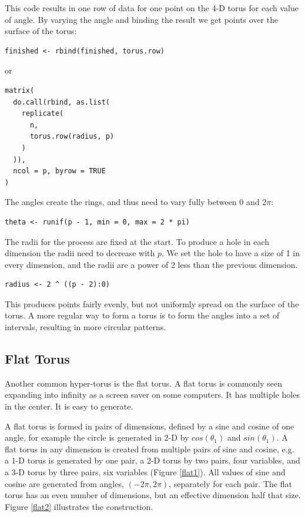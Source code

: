 This code results in one row of data for one point on the 4-D torus
for each value of angle.  By varying the angle and binding the result
we get points over the surface of the torus:

\begin{verbatim}
finished <- rbind(finished, torus.row)
\end{verbatim}

or

\begin{verbatim}
matrix(
  do.call(rbind, as.list(
    replicate(
      n,
      torus.row(radius, p)
    )
  )),
  ncol = p, byrow = TRUE
)
\end{verbatim}

The angles create the rings, and thus need to vary fully between 0 and
$2\pi$:

\begin{verbatim}
theta <- runif(p - 1, min = 0, max = 2 * pi)
\end{verbatim}

The radii for the process are fixed at the start.  To produce a hole
in each dimension the radii need to decrease with $p$.  We set the
hole to have a size of 1 in every dimension, and the radii are a power
of 2 less than the previous dimension.

\begin{verbatim}
radius <- 2 ^ ((p - 2):0)
\end{verbatim}

\noindent This produces points fairly evenly, but not uniformly spread on the surface of
the torus.  A more regular way to form a torus is to form the angles
into a set of intervals, resulting in more circular patterns.

\subsection{Flat Torus}

Another common hyper-torus is the flat torus. A flat torus is commonly
seen expanding into infinity as a screen saver on some computers. It
has multiple holes in the center. It is easy to generate.

A flat torus is formed in pairs of dimensions, defined by a sine and
cosine of one angle, for example the circle is generated in 2-D by
$cos(\theta_1)$ and $sin(\theta_1)$.  A flat torus in any dimension is created
from multiple pairs of sine and cosine, e.g. a 1-D torus is generated by
one pair, a 2-D torus by two pairs, four variables, and a 3-D torus by
three pairs, six variables (Figure \ref{flat1}).  All values of sine
and cosine are generated from angles, $(-2\pi, 2\pi)$, separately for
each pair.  The flat torus has an even number of dimensions, but an
effective dimension half that size. Figure \ref{flat2} illustrates the
construction.

